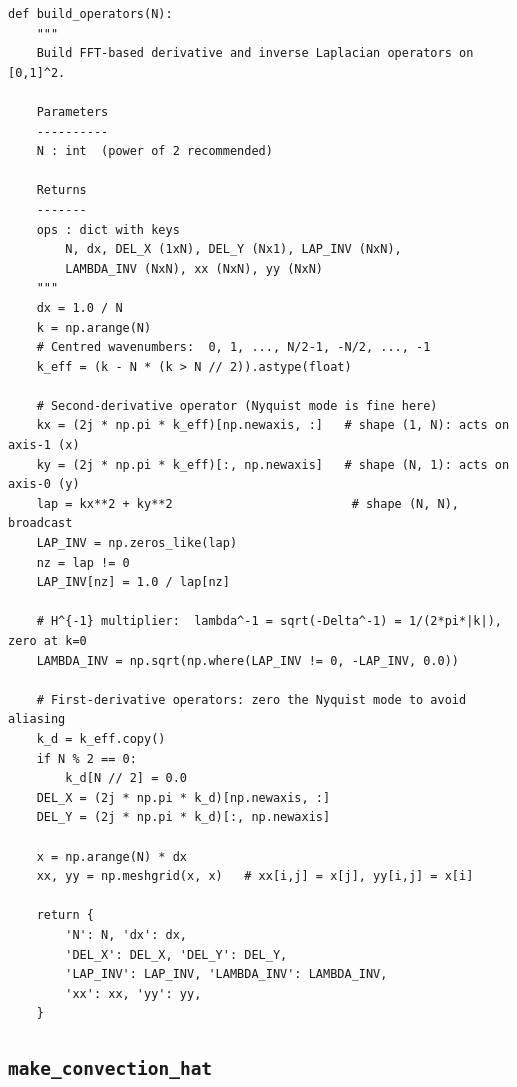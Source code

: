 \documentclass[12pt,a4paper]{article}
\theoremstyle{definition}
\theoremstyle{plain}
\begin{document}
\begin{lstlisting}
def build_operators(N):
    """
    Build FFT-based derivative and inverse Laplacian operators on [0,1]^2.

    Parameters
    ----------
    N : int  (power of 2 recommended)

    Returns
    -------
    ops : dict with keys
        N, dx, DEL_X (1xN), DEL_Y (Nx1), LAP_INV (NxN),
        LAMBDA_INV (NxN), xx (NxN), yy (NxN)
    """
    dx = 1.0 / N
    k = np.arange(N)
    # Centred wavenumbers:  0, 1, ..., N/2-1, -N/2, ..., -1
    k_eff = (k - N * (k > N // 2)).astype(float)

    # Second-derivative operator (Nyquist mode is fine here)
    kx = (2j * np.pi * k_eff)[np.newaxis, :]   # shape (1, N): acts on axis-1 (x)
    ky = (2j * np.pi * k_eff)[:, np.newaxis]   # shape (N, 1): acts on axis-0 (y)
    lap = kx**2 + ky**2                         # shape (N, N), broadcast
    LAP_INV = np.zeros_like(lap)
    nz = lap != 0
    LAP_INV[nz] = 1.0 / lap[nz]

    # H^{-1} multiplier:  lambda^-1 = sqrt(-Delta^-1) = 1/(2*pi*|k|), zero at k=0
    LAMBDA_INV = np.sqrt(np.where(LAP_INV != 0, -LAP_INV, 0.0))

    # First-derivative operators: zero the Nyquist mode to avoid aliasing
    k_d = k_eff.copy()
    if N % 2 == 0:
        k_d[N // 2] = 0.0
    DEL_X = (2j * np.pi * k_d)[np.newaxis, :]
    DEL_Y = (2j * np.pi * k_d)[:, np.newaxis]

    x = np.arange(N) * dx
    xx, yy = np.meshgrid(x, x)   # xx[i,j] = x[j], yy[i,j] = x[i]

    return {
        'N': N, 'dx': dx,
        'DEL_X': DEL_X, 'DEL_Y': DEL_Y,
        'LAP_INV': LAP_INV, 'LAMBDA_INV': LAMBDA_INV,
        'xx': xx, 'yy': yy,
    }
\end{lstlisting}

\subsection{\texttt{make\_convection\_hat}}
\end{document}
